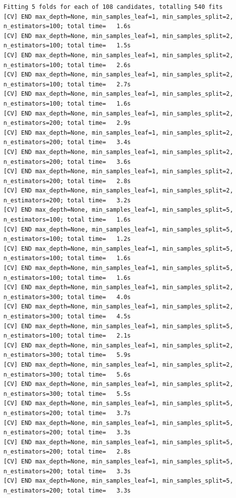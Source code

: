 \documentclass[
  11pt,
  letterpaper,
  DIV=11,
  numbers=noendperiod]{scrartcl}
\begin{document}
\begin{verbatim}
Fitting 5 folds for each of 108 candidates, totalling 540 fits
[CV] END max_depth=None, min_samples_leaf=1, min_samples_split=2, n_estimators=100; total time=   1.6s
[CV] END max_depth=None, min_samples_leaf=1, min_samples_split=2, n_estimators=100; total time=   1.5s
[CV] END max_depth=None, min_samples_leaf=1, min_samples_split=2, n_estimators=100; total time=   2.6s
[CV] END max_depth=None, min_samples_leaf=1, min_samples_split=2, n_estimators=100; total time=   2.7s
[CV] END max_depth=None, min_samples_leaf=1, min_samples_split=2, n_estimators=100; total time=   1.6s
[CV] END max_depth=None, min_samples_leaf=1, min_samples_split=2, n_estimators=200; total time=   2.9s
[CV] END max_depth=None, min_samples_leaf=1, min_samples_split=2, n_estimators=200; total time=   3.4s
[CV] END max_depth=None, min_samples_leaf=1, min_samples_split=2, n_estimators=200; total time=   3.6s
[CV] END max_depth=None, min_samples_leaf=1, min_samples_split=2, n_estimators=200; total time=   2.8s
[CV] END max_depth=None, min_samples_leaf=1, min_samples_split=2, n_estimators=200; total time=   3.2s
[CV] END max_depth=None, min_samples_leaf=1, min_samples_split=5, n_estimators=100; total time=   1.6s
[CV] END max_depth=None, min_samples_leaf=1, min_samples_split=5, n_estimators=100; total time=   1.2s
[CV] END max_depth=None, min_samples_leaf=1, min_samples_split=5, n_estimators=100; total time=   1.6s
[CV] END max_depth=None, min_samples_leaf=1, min_samples_split=5, n_estimators=100; total time=   1.6s
[CV] END max_depth=None, min_samples_leaf=1, min_samples_split=2, n_estimators=300; total time=   4.0s
[CV] END max_depth=None, min_samples_leaf=1, min_samples_split=2, n_estimators=300; total time=   4.5s
[CV] END max_depth=None, min_samples_leaf=1, min_samples_split=5, n_estimators=100; total time=   2.1s
[CV] END max_depth=None, min_samples_leaf=1, min_samples_split=2, n_estimators=300; total time=   5.9s
[CV] END max_depth=None, min_samples_leaf=1, min_samples_split=2, n_estimators=300; total time=   5.6s
[CV] END max_depth=None, min_samples_leaf=1, min_samples_split=2, n_estimators=300; total time=   5.5s
[CV] END max_depth=None, min_samples_leaf=1, min_samples_split=5, n_estimators=200; total time=   3.7s
[CV] END max_depth=None, min_samples_leaf=1, min_samples_split=5, n_estimators=200; total time=   3.3s
[CV] END max_depth=None, min_samples_leaf=1, min_samples_split=5, n_estimators=200; total time=   2.8s
[CV] END max_depth=None, min_samples_leaf=1, min_samples_split=5, n_estimators=200; total time=   3.3s
[CV] END max_depth=None, min_samples_leaf=1, min_samples_split=5, n_estimators=200; total time=   3.3s

\end{verbatim}
\end{document}
